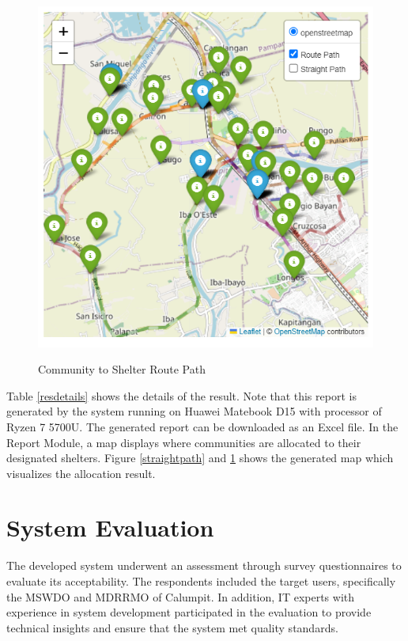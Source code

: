 \documentclass[12pt,a4paper,]{article}
\begin{document}
	\begin{figure}[h!]
		\caption{Community to Shelter Route Path}
		\centering
		\includegraphics[width=\columnwidth]{Chapter 4/route path}
		\label{routepath}
	\end{figure}
	
	Table \ref{resdetails} shows the details of the result. Note that this report is generated by the system running on Huawei Matebook D15 with processor of Ryzen 7 5700U. The generated report can be downloaded as an Excel file. In the Report Module, a map displays where communities are allocated to their designated shelters. Figure \ref{straightpath} and \ref{routepath} shows the generated map which visualizes the allocation result.
	
	\section{System Evaluation}
	The developed system underwent an assessment through survey questionnaires to evaluate its acceptability. The respondents included the target users, specifically the MSWDO and MDRRMO of Calumpit. In addition, IT experts with experience in system development participated in the evaluation to provide technical insights and ensure that the system met quality standards.
	
\end{document}
